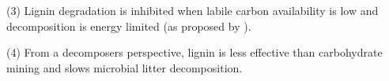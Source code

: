 \documentclass[authoryear,preprint,review,12pt]{elsarticle}
\begin{document}
                                                                                                                                                                                                                                                                                                                                                                                                                                                                                                                                                                                                                                                                                                                                                                                                                                                                                                                                                                                                                                                                                                                                                                                                                                                                                                                                                                                                                                                                                                                                        (3) Lignin degradation is inhibited when labile carbon availability is low and decomposition is energy limited (as proposed by \cite{Klotzbucher2011}).

                                                                                                                                                                                                                                                                                                                                                                                                                                                                                                                                                                                                                                                                                                                                                                                                                                                                                                                                                                                                                                                                                                                                                                                                                                                                                                                                                                                                                                                                                                                                        (4) From a decomposers perspective, lignin is less effective than carbohydrate mining and slows microbial litter decomposition.
\end{document}
